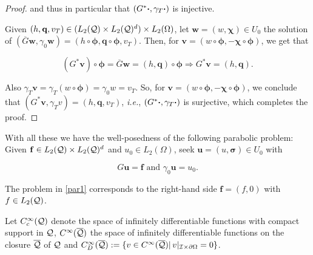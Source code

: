 \begin{proof}
and thus in particular that $(G^*\boldsymbol{\cdot},\gamma_T\boldsymbol{\cdot})$ is injective.  
\vspace{0.3 cm}

Given $(h,\mathbf{q},v_T)\in(L_2(\mathcal{Q})\times L_2(\mathcal{Q})^d)\times L_2(\Omega)$, let $\mathbf{w}=(w,\boldsymbol{\chi})\in U_0$ the solution of $(\overline{G}\mathbf{w},\gamma_0\mathbf{w})=(h\circ\boldsymbol{\phi},\mathbf{q}\circ\boldsymbol{\phi},v_T)$. Then, for $\mathbf{v}=(w\circ\mathbf{\phi}, -\boldsymbol{\chi}\circ\boldsymbol{\phi})$, we get that

$$(G^*\mathbf{v})\circ\boldsymbol{\phi}=\overline{G}\mathbf{w}=(h,\mathbf{q})\circ\boldsymbol{\phi}\Rightarrow G^*\mathbf{v}=(h,\mathbf{q}).$$

Also $\gamma_T\mathbf{v}=\gamma_T(w\circ\boldsymbol{\phi})=\gamma_0w=v_T$. So, for $\mathbf{v}=(w\circ\mathbf{\phi}, -\boldsymbol{\chi}\circ\boldsymbol{\phi})$, we conclude that $(G^*\mathbf{v},\gamma_Tv)=(h,\mathbf{q},v_T)$, \textit{i.e.}, $(G^*\boldsymbol{\cdot},\gamma_T\boldsymbol{\cdot})$ is surjective, which completes the proof.    
\end{proof}

With all these we have the well-posedness of the following parabolic problem: Given $\mathbf{f}\in L_2(\mathcal{Q})\times L_2(\mathcal{Q})^d$ and $u_0\in L_2(\Omega)$, seek $\mathbf{u}=(u,\boldsymbol{\sigma})\in U_0$ with

\begin{equation}\label{parProblem}
        G\mathbf{u}=\mathbf{f} \text{ and }  \gamma_0\mathbf{u}=u_0.
\end{equation}

The problem in \eqref{par1} corresponds to the right-hand side $\mathbf{f}=(f,0)$ with $f\in L_2(\mathcal{Q})$.

\vspace{0.3 cm}

Let $C_c^\infty(\mathcal{Q})$ denote the space of infinitely differentiable functions with compact support in $\mathcal{Q}$, $C^{\infty}(\overline{\mathcal{Q}})$ the space of infinitely differentiable functions on the closure $\overline{\mathcal{Q}}$ of $\mathcal{Q}$ and $C_D^\infty(\overline{\mathcal{Q}}):=\{v\in C^\infty(\overline{\mathcal{Q}})|\,v|_{\mathcal{I}\times\partial\Omega}=0\}$.

